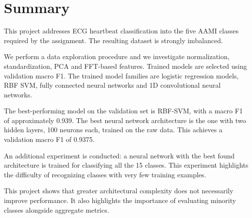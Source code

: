 \documentclass[11pt,oneside,a4paper]{article}
\begin{document}

    

    \clearpage




    \section*{Summary}
    This project addresses ECG heartbeat classification into the
    five AAMI classes required by the assignment. The resulting
    dataset is strongly imbalanced.

    We perform a data exploration procedure and we investigate normalization,
    standardization, PCA and FFT-based features. Trained models are selected using
    validation macro F1.
    The trained model families are logistic regression models, RBF SVM, fully connected neural
    networks and 1D convolutional neural networks.

    The best-performing model on the validation set is RBF-SVM,
    with a macro F1 of approximately 0.939. The best neural network architecture is the one
    with two hidden layers, 100 neurons each, trained on the raw data. This achieves a validation macro F1
    of 0.9375.

    An additional experiment is conducted: a neural network with the best found architecture is trained
    for classifying all the 15 classes. This experiment highlights the difficulty of recognizing classes
    with very few training examples.

    This project shows that greater architectural complexity does not necessarily improve performance.
    It also highlights the importance of evaluating minority classes alongside aggregate metrics.
\end{document}
